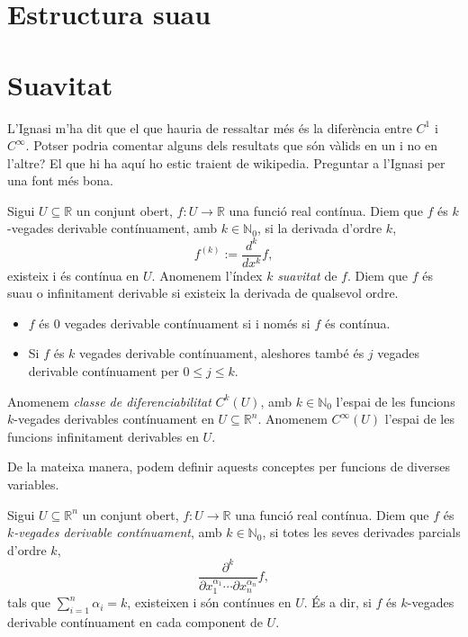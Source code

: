 \section{Estructura suau}













\newpage
\section{Suavitat}
{\color{blue} L'Ignasi m'ha dit que el que hauria de ressaltar més és la diferència entre $C^1$ i $C^\infty$. Potser podria comentar alguns dels resultats que són vàlids en un i no en l'altre?}
{\color{blue} El que hi ha aquí ho estic traient de wikipedia. Preguntar a l'Ignasi per una font més bona.}
\begin{defi}
    Sigui $U\subseteq\mathbb R$ un conjunt obert, $f:U\to\mathbb R$ una funció real contínua.
    Diem que $f$ és {\normalfont $k$-vegades derivable contínuament}, amb $k\in\mathbb N_0$, si la derivada d'ordre $k$, $$f^{(k)}:= \frac{d^k}{dx^k}f,$$ existeix i és contínua en $U$. Anomenem l'índex $k$ \textit{suavitat} de $f$.
    Diem que $f$ és {\normalfont suau} o {\normalfont infinitament derivable} si existeix la derivada de qualsevol ordre.
\end{defi}
\begin{obss}
\end{obss}
\begin{itemize}
    \item $f$ és $0$ vegades derivable contínuament si i només si $f$ és contínua. 
    \item Si $f$ és $k$ vegades derivable contínuament, aleshores també és $j$ vegades derivable contínuament per $0\le j\le k$.
\end{itemize}
\begin{defi}
    Anomenem \textit{classe de diferenciabilitat} $C^k(U)$, amb $k\in\mathbb N_0$ l'espai de les funcions $k$-vegades derivables contínuament en $U\subseteq\mathbb R^n$. Anomenem $C^\infty(U)$ l'espai de les funcions infinitament derivables en $U$.
\end{defi}
De la mateixa manera, podem definir aquests conceptes per funcions de diverses variables.
\begin{defi}
    Sigui $U\subseteq\mathbb R^n$ un conjunt obert, $f:U\to\mathbb R$ una funció real contínua.
    Diem que $f$ és \textit{$k$-vegades derivable contínuament}, amb $k\in\mathbb N_0$, si totes les seves derivades parcials d'ordre $k$, $$\frac{\partial^k}{\partial x_1^{\alpha_1}\cdots\partial x_n^{\alpha_n}}f,$$ tals que $\sum_{i=1}^n\alpha_i = k$, existeixen i són contínues en $U$. És a dir, si $f$ és $k$-vegades derivable contínuament en cada component de $U$.
\end{defi}
